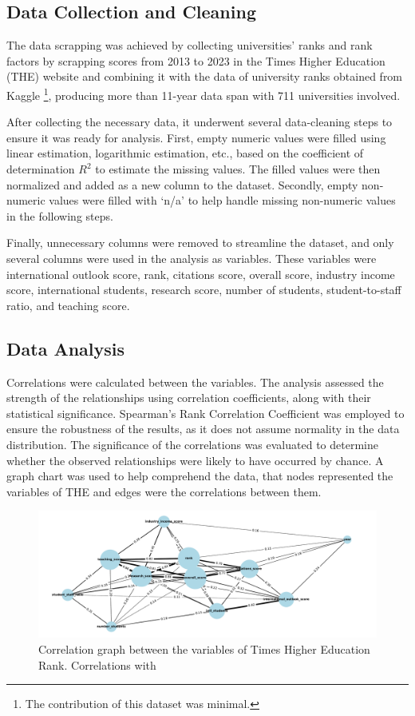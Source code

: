 \documentclass[conference]{IEEEtran}
\begin{document}
\subsection{Data Collection and Cleaning}

The data scrapping was achieved by collecting universities' ranks and rank factors by scrapping scores from 2013 to 2023 in the Times Higher Education (THE) website \cite{the2024} and combining it with the data of university ranks obtained from Kaggle \cite{ONeil_2020}\footnote{The contribution of this dataset was minimal.}, producing more than 11-year data span with 711 universities involved. 

After collecting the necessary data, it underwent several data-cleaning steps to ensure it was ready for analysis. First, empty numeric values were filled using linear estimation, logarithmic estimation, etc., based on the coefficient of determination $R^{2}$ to estimate the missing values. The filled values were then normalized and added as a new column to the dataset. Secondly, empty non-numeric values were filled with `n/a' to help handle missing non-numeric values in the following steps.

Finally, unnecessary columns were removed to streamline the dataset, and only several columns were used in the analysis as variables. These variables were international outlook score, rank, citations score, overall score, industry income score, international students, research score, number of students, student-to-staff ratio, and teaching score. 

\subsection{Data Analysis}

Correlations were calculated between the variables. The analysis assessed the strength of the relationships using correlation coefficients, along with their statistical significance. Spearman's Rank Correlation Coefficient \cite{spearman1904general} was employed to ensure the robustness of the results, as it does not assume normality in the data distribution. The significance of the correlations was evaluated to determine whether the observed relationships were likely to have occurred by chance. A graph chart was used to help comprehend the data, that nodes represented the variables of THE and edges were the correlations between them. 

\begin{figure}[t]
	\centering
	\includegraphics[width=\linewidth]{figures/correlation_graph.pdf}
	\caption{Correlation graph between the variables of Times Higher Education Rank. Correlations with }
	\label{fig:graf_citation}
\end{figure}
\end{document}
